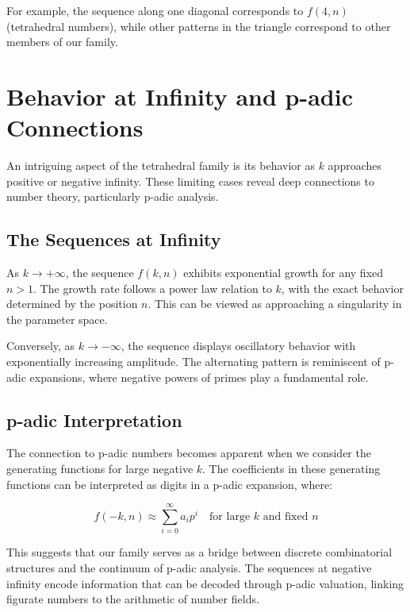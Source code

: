 \documentclass[12pt,a4paper]{article}
\begin{document}
For example, the sequence along one diagonal corresponds to $f(4,n)$ (tetrahedral numbers), while other patterns in the triangle correspond to other members of our family.

\section{Behavior at Infinity and p-adic Connections}

An intriguing aspect of the tetrahedral family is its behavior as $k$ approaches positive or negative infinity. These limiting cases reveal deep connections to number theory, particularly p-adic analysis.

\subsection{The Sequences at Infinity}

As $k \to +\infty$, the sequence $f(k,n)$ exhibits exponential growth for any fixed $n > 1$. The growth rate follows a power law relation to $k$, with the exact behavior determined by the position $n$. This can be viewed as approaching a singularity in the parameter space.

Conversely, as $k \to -\infty$, the sequence displays oscillatory behavior with exponentially increasing amplitude. The alternating pattern is reminiscent of p-adic expansions, where negative powers of primes play a fundamental role.

\subsection{p-adic Interpretation}

The connection to p-adic numbers becomes apparent when we consider the generating functions for large negative $k$. The coefficients in these generating functions can be interpreted as digits in a p-adic expansion, where:

\begin{equation}
f(-k,n) \approx \sum_{i=0}^{\infty} a_i p^i \quad \text{for large } k \text{ and fixed } n
\end{equation}

This suggests that our family serves as a bridge between discrete combinatorial structures and the continuum of p-adic analysis. The sequences at negative infinity encode information that can be decoded through p-adic valuation, linking figurate numbers to the arithmetic of number fields.
\end{document}
